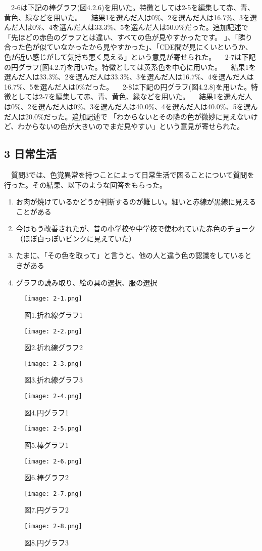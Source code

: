 　2-6は下記の棒グラフ(図4.2.6)を用いた。特徴としては2-5を編集して赤、青、黄色、緑などを用いた。
　結果1を選んだ人は0\%、2を選んだ人は16.7\%、3を選んだ人は0\%、4を選んだ人は33.3\%、5を選んだ人は50.0\%だった。追加記述で「先ほどの赤色のグラフとは違い、すべての色が見やすかったです。 」、「隣り合った色が似ていなかったから見やすかった」、「CDE間が見にくいというか、色が近い感じがして気持ち悪く見える」という意見が寄せられた。
　2-7は下記の円グラフ(図4.2.7)を用いた。特徴としては黄系色を中心に用いた。
　結果1を選んだ人は33.3\%、2を選んだ人は33.3\%、3を選んだ人は16.7\%、4を選んだ人は16.7\%、5を選んだ人は0\%だった。
　2-8は下記の円グラフ(図4.2.8)を用いた。特徴としては2-7を編集して赤、青、黄色、緑などを用いた。
　結果1を選んだ人は0\%、2を選んだ人は0\%、3を選んだ人は40.0\%、4を選んだ人は40.0\%、5を選んだ人は20.0\%だった。追加記述で 「わからないとその隣の色が微妙に見えないけど、わからないの色が大きいのでまだ見やすい」という意見が寄せられた。
\subsection{3 日常生活}
　質問3では、色覚異常を持つことによって日常生活で困ることについて質問を行った。その結果、以下のような回答をもらった。
\begin{enumerate}
  \item お肉が焼けているかどうか判断するのが難しい。細いと赤線が黒線に見えることがある
  \item 今はもう改善されたが、昔の小学校や中学校で使われていた赤色のチョーク（ほぼ白っぽいピンクに見えていた）
  \item たまに、「その色を取って」と言うと、他の人と違う色の認識をしているときがある
  \item グラフの読み取り、絵の具の選択、服の選択
\end{enumerate}
\begin{figure}[h] %
  \centering
  \texttt{[image: 2-1.png]}
  \caption{図1.折れ線グラフ1}
  \label{fig:2-1} %
  \texttt{[image: 2-2.png]}
  \caption{図2.折れ線グラフ2}
  \label{fig:2-2} %
  \texttt{[image: 2-3.png]}
  \caption{図3.折れ線グラフ3}
  \label{fig:2-3} %
  \newpage
  \texttt{[image: 2-4.png]}
  \caption{図4.円グラフ1}
  \label{fig:2-4} %
  \texttt{[image: 2-5.png]}
  \caption{図5.棒グラフ1}
  \label{fig:2-5} %
  \texttt{[image: 2-6.png]}
  \caption{図6.棒グラフ2}
  \label{fig:2-6} %
  \newpage
  \texttt{[image: 2-7.png]}
  \caption{図7.円グラフ2}
  \label{fig:2-7} %
  \texttt{[image: 2-8.png]}
  \caption{図8.円グラフ3}
  \label{fig:2-8} %
\end{figure}
